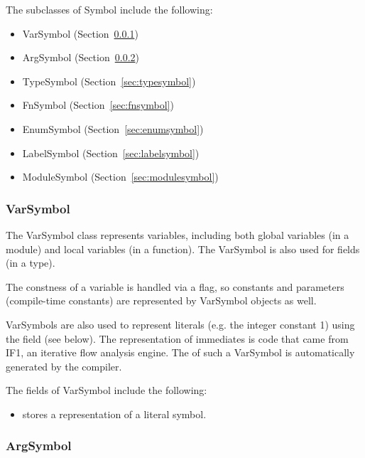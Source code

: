 \documentclass[10pt]{article}
\begin{document}
The subclasses of Symbol include the following:
\begin{itemize}
\item VarSymbol (Section~\ref{sec:varsymbol})
\item ArgSymbol (Section~\ref{sec:argsymbol})
\item TypeSymbol (Section~\ref{sec:typesymbol})
\item FnSymbol (Section~\ref{sec:fnsymbol})
\item EnumSymbol (Section~\ref{sec:enumsymbol})
\item LabelSymbol (Section~\ref{sec:labelsymbol})
\item ModuleSymbol (Section~\ref{sec:modulesymbol})
\end{itemize}

\subsubsection{VarSymbol}
\label{sec:varsymbol}

The VarSymbol class represents variables, including both global
variables (in a module) and local variables (in a function).  The
VarSymbol is also used for fields (in a type).

The constness of a variable is handled via a flag, so constants and
parameters (compile-time constants) are represented by VarSymbol
objects as well.

VarSymbols are also used to represent literals (e.g. the integer
constant 1) using the field  (see below).  The
representation of immediates is code that came from IF1, an iterative
flow analysis engine.  The  of such a VarSymbol is
automatically generated by the compiler.

The fields of VarSymbol include the following:
\begin{itemize}
\item {} stores a representation of a literal symbol.
\end{itemize}

\subsubsection{ArgSymbol}
\label{sec:argsymbol}
\end{document}
